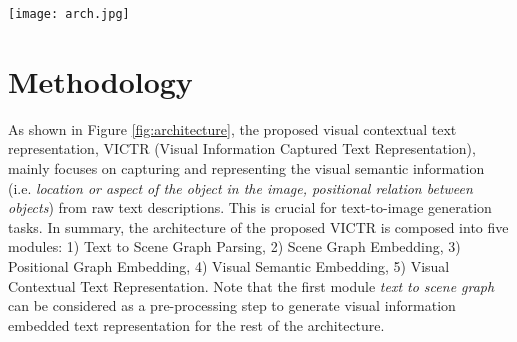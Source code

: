 \documentclass[11pt]{article}
\begin{document}
\begin{figure*}[t]
\centering
  \texttt{[image: arch.jpg]}
  \caption{Schematic of the proposed visual contextual text representation (VICTR)}
  \label{fig:architecture}
\end{figure*}

\section{Methodology}
As shown in Figure \ref{fig:architecture}, the proposed visual contextual text representation, VICTR (Visual Information Captured Text Representation), mainly focuses on capturing and representing the visual semantic information (i.e. \textit{location or aspect of the object in the image, positional relation between objects}) from raw text descriptions. This is crucial for text-to-image generation tasks. In summary, the architecture of the proposed VICTR is composed into five modules: 1) Text to Scene Graph Parsing, 2) Scene Graph Embedding, 3) Positional Graph Embedding, 4) Visual Semantic Embedding, 5) Visual Contextual Text Representation. Note that the first module \textit{text to scene graph} can be considered as a pre-processing step to generate visual information embedded text representation for the rest of the architecture.
\end{document}
